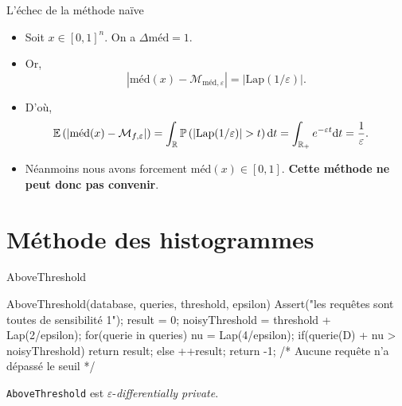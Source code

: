 \documentclass[10pt,serif]{beamer}
\begin{document}
  \begin{frame}{L'échec de la méthode naïve}
    \begin{itemize}
      \item<1-> Soit \(x \in [0,1]^n\). On a \(\Delta\text{méd} = 1\).\\
      \item<2->  Or,   \[
        |\text{méd}(x) - \mathcal M_{\text{méd}, \varepsilon}| = |\text{Lap}(1/\varepsilon)|.    
      \] 

      \item<3->  D'où,  \begin{align*}
          \mathbb E\left( |\text{méd}(x) - \mathcal M_{f, \varepsilon}| \right) & = \int_{\mathbb{R}} \mathbb P \left( |\text{Lap}(1/\varepsilon)| > t \right) \mathrm{d} t = \int_{\mathbb{R}_+} e^{-\varepsilon t}  \mathrm{d} t = \dfrac{1}{\varepsilon}.
        \end{align*} 

      \item<4-> Néanmoins nous avons forcement \(\text{méd}(x) \in [0,1]\). \textbf{Cette méthode ne peut donc pas convenir}.
    \end{itemize}
  \end{frame}




\section{Méthode des histogrammes}
  \begin{frame}[containsverbatim]{AboveThreshold \cite{10.1007/11681878_14}}
    \begin{code}
  AboveThreshold(database, queries, threshold, epsilon){
    Assert("les requêtes sont toutes de sensibilité 1");
    result = 0;
    noisyThreshold = threshold + Lap(2/epsilon);
    for(querie in queries){
        nu = Lap(4/epsilon);
        if(querie(D) + nu > noisyThreshold)
            return result;
        else
            ++result; 
    }
    return -1; /* Aucune requête n'a dépassé le seuil */
  }
    \end{code}
    \begin{theorem}
      \texttt{AboveThreshold} est \(\varepsilon\)-\textit{differentially private}.
    \end{theorem}
  \end{frame} 
\end{document}
